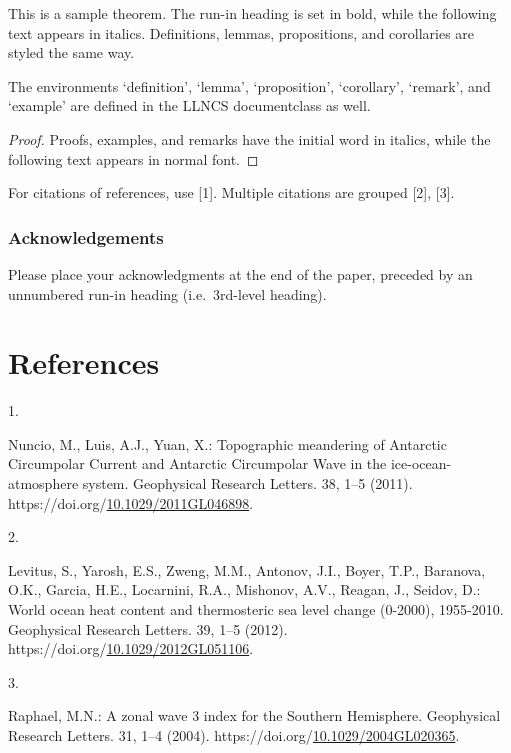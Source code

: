 \documentclass[runningheads]{llncs}
\newlength{\cslhangindent}
\newlength{\csllabelwidth}
\newlength{\cslentryspacingunit} %
\newenvironment{CSLReferences}[2] %
 {%
  \setlength{\parindent}{0pt}
  \ifodd #1
  \let\oldpar\par
  \def\par{\hangindent=\cslhangindent\oldpar}
  \fi
  \setlength{\parskip}{#2\cslentryspacingunit}
 }%
 {}
\newcommand{\CSLLeftMargin}[1]{\parbox[t]{\csllabelwidth}{#1}}
\newcommand{\CSLRightInline}[1]{\parbox[t]{\linewidth - \csllabelwidth}{#1}\break}
\begin{document}
\begin{theorem}
This is a sample theorem. The run-in heading is set in bold, while the
following text appears in italics. Definitions, lemmas, propositions,
and corollaries are styled the same way.

\end{theorem}

The environments `definition', `lemma', `proposition', `corollary',
`remark', and `example' are defined in the LLNCS documentclass as well.

\begin{proof}
Proofs, examples, and remarks have the initial word in italics, while
the following text appears in normal font.

\end{proof}

For citations of references, use {[}1{]}. Multiple citations are grouped
{[}2{]}, {[}3{]}.

\hypertarget{acknowledgements}{%
\subsubsection{Acknowledgements}\label{acknowledgements}}

Please place your acknowledgments at the end of the paper, preceded by
an unnumbered run-in heading (i.e.~3rd-level heading).

\hypertarget{references}{%
\section*{References}\label{references}}

\hypertarget{refs}{}
\begin{CSLReferences}{0}{0}
\leavevmode{}%
\CSLLeftMargin{1. }%
\CSLRightInline{Nuncio, M., Luis, A.J., Yuan, X.: {Topographic
meandering of Antarctic Circumpolar Current and Antarctic Circumpolar
Wave in the ice-ocean-atmosphere system}. Geophysical Research Letters.
38, 1--5 (2011).
https://doi.org/\href{https://doi.org/10.1029/2011GL046898}{10.1029/2011GL046898}.}

\leavevmode{}%
\CSLLeftMargin{2. }%
\CSLRightInline{Levitus, S., Yarosh, E.S., Zweng, M.M., Antonov, J.I.,
Boyer, T.P., Baranova, O.K., Garcia, H.E., Locarnini, R.A., Mishonov,
A.V., Reagan, J., Seidov, D.: {World ocean heat content and thermosteric
sea level change (0-2000), 1955-2010}. Geophysical Research Letters. 39,
1--5 (2012).
https://doi.org/\href{https://doi.org/10.1029/2012GL051106}{10.1029/2012GL051106}.}

\leavevmode{}%
\CSLLeftMargin{3. }%
\CSLRightInline{Raphael, M.N.: {A zonal wave 3 index for the Southern
Hemisphere}. Geophysical Research Letters. 31, 1--4 (2004).
https://doi.org/\href{https://doi.org/10.1029/2004GL020365}{10.1029/2004GL020365}.}

\end{CSLReferences}

%
\end{document}
